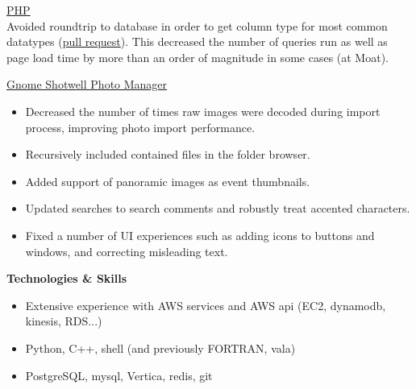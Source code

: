 \vspace{\littleskip}
\vspace{\littleskip}

\href{https://github.com/php/php-src}{PHP}\\
Avoided roundtrip to database in order to get column type for most common datatypes (\href{https://github.com/php/php-src/pull/1534}{pull request}).
This decreased the number of queries run as well as page load time by more than an order of magnitude in some cases (at Moat).

\vspace{\littleskip}
\vspace{\littleskip}

\href{https://gitlab.gnome.org/GNOME/shotwell}{Gnome Shotwell Photo Manager}\\
\begin{itemize}[topsep=1ex, partopsep=0ex, parsep=0ex, itemsep=0.5ex]
    \item Decreased the number of times raw images were decoded during import process, improving photo import performance.
    \item Recursively included contained files in the folder browser.
    \item Added support of panoramic images as event thumbnails.
    \item Updated searches to search comments and robustly treat accented characters.
    \item Fixed a number of UI experiences such as adding icons to buttons and windows, and correcting misleading text.
\end{itemize}


\vspace{\mybigskip}
\myfontsize{\littleheader}
\textbf{Technologies \& Skills}\\
\myfontsize{\bodysize}
\begin{itemize}[topsep=1ex, partopsep=0ex, parsep=0ex, itemsep=0.5ex]
    \item Extensive experience with AWS services and AWS api (EC2, dynamodb, kinesis, RDS...)
    \item Python, C++, shell (and previously FORTRAN, vala)
    \item PostgreSQL, mysql, Vertica, redis, git
\end{itemize}

